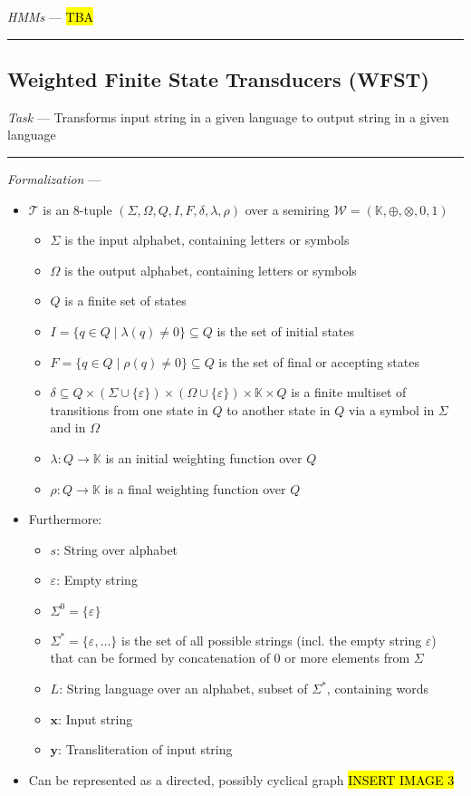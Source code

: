 \emph{HMMs} --- 
\hl{TBA}

{\color{black}\hrule height 0.001mm}

\subsection*{Weighted Finite State Transducers (WFST)}
\emph{Task} --- Transforms input string in a given language to output string in a given language

{\color{lightgrey}\hrule height 0.001mm}

\emph{Formalization} --- 
\begin{itemize}
    \item $\mathcal{T}$ is an 8-tuple $(\Sigma, \Omega, Q, I, F, \delta, \lambda, \rho)$ over a semiring $\mathcal{W} = (\mathbb{K}, \oplus, \otimes, 0, 1)$
    \begin{itemize}
        \item $\Sigma$ is the input alphabet, containing letters or symbols
        \item $\Omega$ is the output alphabet, containing letters or symbols
        \item $Q$ is a finite set of states
        \item $I = \{q \in Q \mid \lambda(q) \neq 0\} \subseteq Q$ is the set of initial states
        \item $F = \{q \in Q \mid \rho(q) \neq 0\} \subseteq Q$ is the set of final or accepting states
        \item $\delta \subseteq Q \times (\Sigma \cup \{\varepsilon\}) \times (\Omega \cup \{\varepsilon\}) \times \mathbb{K} \times Q$ is a finite multiset of transitions from one state in $Q$ to another state in $Q$ via a symbol in $\Sigma$ and in $\Omega$
        \item $\lambda : Q \to \mathbb{K}$ is an initial weighting function over $Q$
        \item $\rho : Q \to \mathbb{K}$ is a final weighting function over $Q$
    \end{itemize}
    \item Furthermore:
    \begin{itemize}
        \item $s$: String over alphabet
        \item $\varepsilon$: Empty string
        \item $\Sigma^0 = \{\varepsilon\}$
        \item $\Sigma^* = \{\varepsilon, \ldots\}$ is the set of all possible strings (incl. the empty string $\varepsilon$) that can be formed by concatenation of 0 or more elements from $\Sigma$ 
        \item $L$: String language over an alphabet, subset of $\Sigma^*$, containing words
        \item $\boldsymbol{x}$: Input string
        \item $\boldsymbol{y}$: Transliteration of input string
    \end{itemize}
    \item Can be represented as a directed, possibly cyclical graph
    \hl{INSERT IMAGE 3}
\end{itemize}

